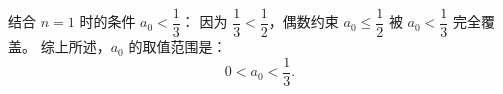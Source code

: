 \begin{answer}
结合 $n = 1$ 时的条件 $a_0 < \dfrac{1}{3}$：
因为 $\dfrac{1}{3} < \dfrac{1}{2}$，偶数约束 $a_0 \le \dfrac{1}{2}$ 被 $a_0 < \dfrac{1}{3}$ 完全覆盖。
综上所述，$a_0$ 的取值范围是：
\nopagebreak[4]
\[0 < a_0 < \frac{1}{3}.\]



\end{answer}